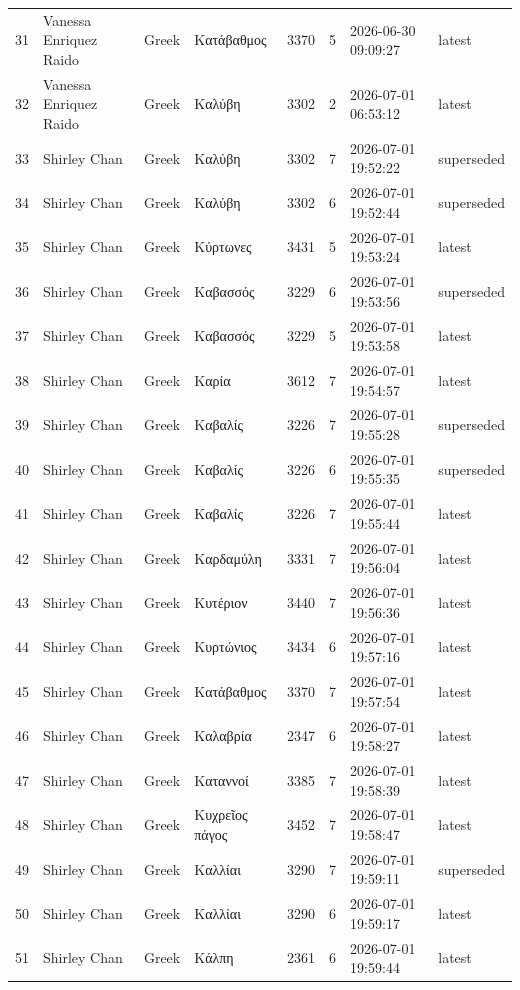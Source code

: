 \begin{longtable}{@{}r l l l r r l l@{}}
31 & Vanessa Enriquez Raido & Greek & Κατάβαθμος & 3370 & 5 & 2026-06-30 09:09:27 & latest \\
32 & Vanessa Enriquez Raido & Greek & Καλύβη & 3302 & 2 & 2026-07-01 06:53:12 & latest \\
33 & Shirley Chan & Greek & Καλύβη & 3302 & 7 & 2026-07-01 19:52:22 & superseded \\
34 & Shirley Chan & Greek & Καλύβη & 3302 & 6 & 2026-07-01 19:52:44 & superseded \\
35 & Shirley Chan & Greek & Κύρτωνες & 3431 & 5 & 2026-07-01 19:53:24 & latest \\
36 & Shirley Chan & Greek & Καβασσός & 3229 & 6 & 2026-07-01 19:53:56 & superseded \\
37 & Shirley Chan & Greek & Καβασσός & 3229 & 5 & 2026-07-01 19:53:58 & latest \\
38 & Shirley Chan & Greek & Καρία & 3612 & 7 & 2026-07-01 19:54:57 & latest \\
39 & Shirley Chan & Greek & Καβαλίς & 3226 & 7 & 2026-07-01 19:55:28 & superseded \\
40 & Shirley Chan & Greek & Καβαλίς & 3226 & 6 & 2026-07-01 19:55:35 & superseded \\
41 & Shirley Chan & Greek & Καβαλίς & 3226 & 7 & 2026-07-01 19:55:44 & latest \\
42 & Shirley Chan & Greek & Καρδαμύλη & 3331 & 7 & 2026-07-01 19:56:04 & latest \\
43 & Shirley Chan & Greek & Κυτέριον & 3440 & 7 & 2026-07-01 19:56:36 & latest \\
44 & Shirley Chan & Greek & Κυρτώνιος & 3434 & 6 & 2026-07-01 19:57:16 & latest \\
45 & Shirley Chan & Greek & Κατάβαθμος & 3370 & 7 & 2026-07-01 19:57:54 & latest \\
46 & Shirley Chan & Greek & Καλαβρία & 2347 & 6 & 2026-07-01 19:58:27 & latest \\
47 & Shirley Chan & Greek & Καταννοί & 3385 & 7 & 2026-07-01 19:58:39 & latest \\
48 & Shirley Chan & Greek & Κυχρεῖος πάγος & 3452 & 7 & 2026-07-01 19:58:47 & latest \\
49 & Shirley Chan & Greek & Καλλίαι & 3290 & 7 & 2026-07-01 19:59:11 & superseded \\
50 & Shirley Chan & Greek & Καλλίαι & 3290 & 6 & 2026-07-01 19:59:17 & latest \\
51 & Shirley Chan & Greek & Κάλπη & 2361 & 6 & 2026-07-01 19:59:44 & latest \\

\end{longtable}
